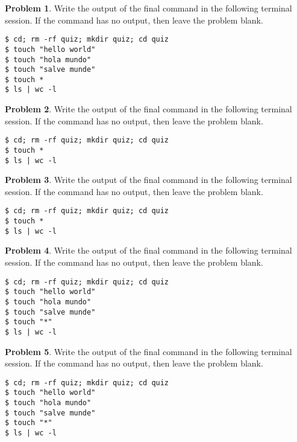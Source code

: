 \documentclass[10pt]{article}
\theoremstyle{definition}
\newtheorem{problem}{Problem}
\begin{document}
\filbreak
\begin{problem}
    Write the output of the final command in the following terminal session.
    If the command has no output, then leave the problem blank.
\end{problem}
\begin{lstlisting}
$ cd; rm -rf quiz; mkdir quiz; cd quiz
$ touch "hello world"
$ touch "hola mundo"
$ touch "salve munde"
$ touch *
$ ls | wc -l
\end{lstlisting}


\filbreak
\begin{problem}
    Write the output of the final command in the following terminal session.
    If the command has no output, then leave the problem blank.
\end{problem}
\begin{lstlisting}
$ cd; rm -rf quiz; mkdir quiz; cd quiz
$ touch *
$ ls | wc -l
\end{lstlisting}
\filbreak


\filbreak
\begin{problem}
    Write the output of the final command in the following terminal session.
    If the command has no output, then leave the problem blank.
\end{problem}
\begin{lstlisting}
$ cd; rm -rf quiz; mkdir quiz; cd quiz
$ touch *
$ ls | wc -l
\end{lstlisting}
\filbreak


\filbreak
\begin{problem}
    Write the output of the final command in the following terminal session.
    If the command has no output, then leave the problem blank.
\end{problem}
\begin{lstlisting}
$ cd; rm -rf quiz; mkdir quiz; cd quiz
$ touch "hello world"
$ touch "hola mundo"
$ touch "salve munde"
$ touch "*"
$ ls | wc -l
\end{lstlisting}


\filbreak
\begin{problem}
    Write the output of the final command in the following terminal session.
    If the command has no output, then leave the problem blank.
\end{problem}
\begin{lstlisting}
$ cd; rm -rf quiz; mkdir quiz; cd quiz
$ touch "hello world"
$ touch "hola mundo"
$ touch "salve munde"
$ touch "*"
$ ls | wc -l
\end{lstlisting}
\end{document}
